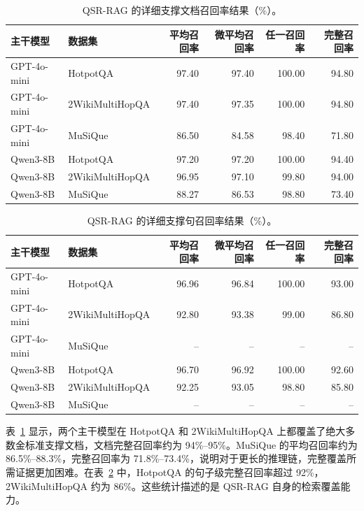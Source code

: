 \documentclass[11pt]{article}
\begin{document}
	\begin{table}[t]
		\centering
		\caption{QSR-RAG 的详细支撑文档召回率结果（\%）。}
		\label{tab:document-recall-detailed}
		\small
		\setlength{\tabcolsep}{6pt}
		\begin{tabular}{llrrrr}
			\toprule
			主干模型 & 数据集 & 平均召回率 & 微平均召回率 & 任一召回率 & 完整召回率\\
			\midrule
			GPT-4o-mini & HotpotQA        & 97.40 & 97.40 & 100.00 & 94.80\\
			GPT-4o-mini & 2WikiMultiHopQA & 97.40 & 97.35 & 100.00 & 94.80\\
			GPT-4o-mini & MuSiQue         & 86.50 & 84.58 & 98.40  & 71.80\\
			\midrule
			Qwen3-8B    & HotpotQA        & 97.20 & 97.20 & 100.00 & 94.40\\
			Qwen3-8B    & 2WikiMultiHopQA & 96.95 & 97.10 & 99.80  & 94.00\\
			Qwen3-8B    & MuSiQue         & 88.27 & 86.53 & 98.80  & 73.40\\
			\bottomrule
		\end{tabular}
	\end{table}

	\begin{table}[t]
		\centering
		\caption{QSR-RAG 的详细支撑句召回率结果（\%）。}
		\label{tab:sentence-recall-detailed}
		\small
		\setlength{\tabcolsep}{6pt}
		\begin{tabular}{llrrrr}
			\toprule
			主干模型 & 数据集 & 平均召回率 & 微平均召回率 & 任一召回率 & 完整召回率\\
			\midrule
			GPT-4o-mini & HotpotQA        & 96.96 & 96.84 & 100.00 & 93.00\\
			GPT-4o-mini & 2WikiMultiHopQA & 92.80 & 93.38 & 99.00  & 86.80\\
			GPT-4o-mini & MuSiQue         & --    & --    & --     & --\\
			\midrule
			Qwen3-8B    & HotpotQA        & 96.70 & 96.92 & 100.00 & 92.60\\
			Qwen3-8B    & 2WikiMultiHopQA & 92.25 & 93.05 & 98.80  & 85.80\\
			Qwen3-8B    & MuSiQue         & --    & --    & --     & --\\
			\bottomrule
		\end{tabular}
	\end{table}

	表~\ref{tab:document-recall-detailed} 显示，两个主干模型在 HotpotQA 和 2WikiMultiHopQA 上都覆盖了绝大多数金标准支撑文档，文档完整召回率约为 94\%--95\%。MuSiQue 的平均召回率约为 86.5\%--88.3\%，完整召回率为 71.8\%--73.4\%，说明对于更长的推理链，完整覆盖所需证据更加困难。在表~\ref{tab:sentence-recall-detailed} 中，HotpotQA 的句子级完整召回率超过 92\%，2WikiMultiHopQA 约为 86\%。这些统计描述的是 QSR-RAG 自身的检索覆盖能力。
\end{document}
